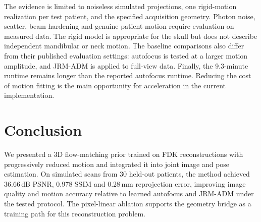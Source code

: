 \documentclass[11pt]{article}
\begin{document}
The evidence is limited to noiseless simulated projections, one rigid-motion realization
per test patient, and the specified acquisition geometry. Photon noise, scatter, beam
hardening and genuine patient motion require evaluation on measured data. The rigid
model is appropriate for the skull but does not describe independent mandibular or neck
motion. The baseline comparisons also differ from their published evaluation settings:
autofocus is tested at a larger motion amplitude, and JRM-ADM is applied to full-view
data. Finally, the 9.3-minute runtime remains longer than the reported autofocus runtime.
Reducing the cost of motion fitting is the main opportunity for acceleration in the
current implementation.

\section{Conclusion}
\label{sec:conclusion}

We presented a 3D flow-matching prior trained on FDK reconstructions with progressively
reduced motion and integrated it into joint image and pose estimation. On simulated
scans from 30 held-out patients, the method achieved 36.66\,dB PSNR, 0.978 SSIM and
0.28\,mm reprojection error, improving image quality and motion accuracy relative to
learned autofocus and JRM-ADM under the tested protocol. The pixel-linear ablation
supports the geometry bridge as a training path for this reconstruction problem.
\end{document}
